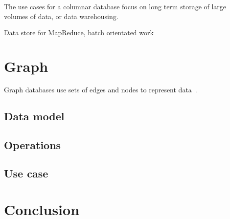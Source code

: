 \documentclass{CRPITStyle}
\renewcommand{\cite}{\citep}
\begin{document}
The use cases for a columnar database focus on long term storage of large
volumes of data, or data warehousing.

Data store for MapReduce, batch orientated work

\cite{nosql_performance}
\cite{bigtable}


\section{Graph}

Graph databases use sets of edges and nodes to represent
data~\cite{nosql_survey}.


\subsection{Data model}

\subsection{Operations}


\subsection{Use case}

\cite{nosql_performance}

\section{Conclusion}



\end{document}
